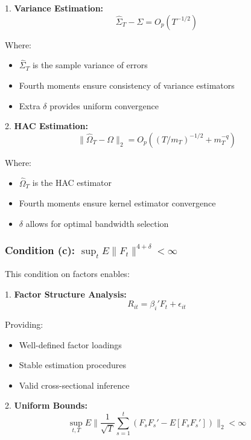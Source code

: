 \documentclass[12pt,article]{memoir}
\begin{document}
1. \textbf{Variance Estimation:}
\begin{equation}
    \hat{\Sigma}_T - \Sigma = O_p(T^{-1/2})
\end{equation}

Where:
\begin{itemize}
    \item $\hat{\Sigma}_T$ is the sample variance of errors
    \item Fourth moments ensure consistency of variance estimators
    \item Extra $\delta$ provides uniform convergence
\end{itemize}

2. \textbf{HAC Estimation:}
\begin{equation}
    \|\hat{\Omega}_T - \Omega\|_2 = O_p((T/m_T)^{-1/2} + m_T^{-q})
\end{equation}

Where:
\begin{itemize}
    \item $\hat{\Omega}_T$ is the HAC estimator
    \item Fourth moments ensure kernel estimator convergence
    \item $\delta$ allows for optimal bandwidth selection
\end{itemize}

\subsubsection{Condition (c): $\sup_t E\|F_t\|^{4+\delta} < \infty$}

This condition on factors enables:

1. \textbf{Factor Structure Analysis:}
\begin{equation}
    R_{it} = \beta_i'F_t + \epsilon_{it}
\end{equation}

Providing:
\begin{itemize}
    \item Well-defined factor loadings
    \item Stable estimation procedures
    \item Valid cross-sectional inference
\end{itemize}

2. \textbf{Uniform Bounds:}
\begin{equation}
    \sup_{t,T} E\|\frac{1}{\sqrt{T}}\sum_{s=1}^t (F_sF_s' - E[F_sF_s'])\|_2 < \infty
\end{equation}
\end{document}
